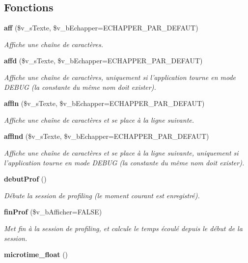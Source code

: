 \subsection*{Fonctions}
\begin{CompactItemize}
\item 
{\bf aff} (\$v\_\-sTexte, \$v\_\-bEchapper=ECHAPPER\_\-PAR\_\-DEFAUT)
\begin{CompactList}\small\item\em Affiche une chaîne de caractères. \item\end{CompactList}\item 
{\bf affd} (\$v\_\-sTexte, \$v\_\-bEchapper=ECHAPPER\_\-PAR\_\-DEFAUT)
\begin{CompactList}\small\item\em Affiche une chaîne de caractères, uniquement si l'application tourne en mode DEBUG (la constante du même nom doit exister). \item\end{CompactList}\item 
{\bf affln} (\$v\_\-sTexte, \$v\_\-bEchapper=ECHAPPER\_\-PAR\_\-DEFAUT)
\begin{CompactList}\small\item\em Affiche une chaîne de caractères et se place à la ligne suivante. \item\end{CompactList}\item 
{\bf afflnd} (\$v\_\-sTexte, \$v\_\-bEchapper=ECHAPPER\_\-PAR\_\-DEFAUT)
\begin{CompactList}\small\item\em Affiche une chaîne de caractères et se place à la ligne suivante, uniquement si l'application tourne en mode DEBUG (la constante du même nom doit exister). \item\end{CompactList}\item 
{\bf debutProf} ()\label{export_8php_bd4220de209adbf61ff587159525294d}

\begin{CompactList}\small\item\em Débute la session de profiling (le moment courant est enregistré). \item\end{CompactList}\item 
{\bf finProf} (\$v\_\-bAfficher=FALSE)
\begin{CompactList}\small\item\em Met fin à la session de profiling, et calcule le temps écoulé depuis le début de la session. \item\end{CompactList}\item 
{\bf microtime\_\-float} ()\label{export_8php_6b5adb70a7aed1d4f6cda2ffbca36d6b}


\end{CompactItemize}
